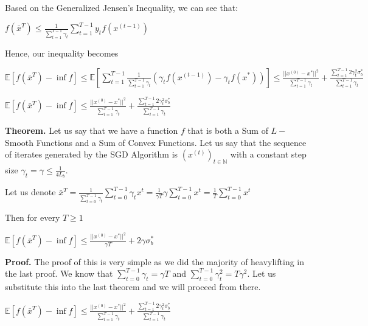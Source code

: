 Based on the Generalized Jensen's Inequality, we can see that: \newline 

$f(\bar{x}^T) \leq \frac{1}{\sum_{t = 1}^{T - 1} \gamma_t} \sum_{t=1}^{T - 1} y_t f(x^{(t - 1)})$

Hence, our inequality becomes \newline 

$\mathbb{E} [f(\bar{x}^T) - \inf f] \leq \mathbb{E} [\sum_{t=1}^{T - 1} \frac{1}{\sum_{t = 1}^{T - 1} \gamma_t}  (\gamma_t f(x^{(t - 1)}) - \gamma_t f(x^*))] \leq \frac{||x^{(0)} - x^*||^2}{\sum_{t = 1}^{T - 1} \gamma_t} + \frac{\sum_{t=1}^{T - 1} 2 \gamma_t^2 \sigma_b^*}{\sum_{t = 1}^{T - 1} \gamma_t}$ \newline 

$\mathbb{E} [f(\bar{x}^T) - \inf f] \leq \frac{||x^{(0)} - x^*||^2}{\sum_{t = 1}^{T - 1} \gamma_t} + \frac{\sum_{t=1}^{T - 1} 2 \gamma_t^2 \sigma_b^*}{\sum_{t = 1}^{T - 1} \gamma_t}$ \newline 

\noindent \textbf{Theorem.} Let us say that we have a function $f$ that is both a Sum of $L-$Smooth Functions and a Sum of Convex Functions. Let us say that the sequence of iterates generated by the SGD Algorithm is $(x^{(t)})_{t \in \mathbb{N}}$ with a constant step size $\gamma_t = \gamma \leq \frac{1}{4L_{b}}$.

Let us denote $\bar{x}^T = \frac{1}{\sum_{t = 0}^{T - 1} \gamma_t} \sum_{t = 0}^{T - 1} \gamma_t x^t = \frac{1}{\gamma T} \gamma \sum_{t = 0}^{T - 1} x^t = \frac{1}{T} \sum_{t = 0}^{T - 1} x^t$ \newline 

Then for every $T \geq 1$ \newline 

$\mathbb{E}[f(\bar{x}^T) - \inf f] \leq \frac{||x^{(0)} - x^*||^2}{\gamma T} + 2\gamma \sigma_b^* $ \newline 

\noindent \textbf{Proof.} The proof of this is very simple as we did the majority of heavylifting in the last proof. We know that $\sum_{t = 0}^{T - 1} \gamma_t = \gamma T$ and $\sum_{t = 0}^{T - 1} \gamma_t^2 = T\gamma^2$. Let us substitute this into the last theorem and we will proceed from there. 

$\mathbb{E} [f(\bar{x}^T) - \inf f] \leq \frac{||x^{(0)} - x^*||^2}{\sum_{t = 1}^{T - 1} \gamma_t} + \frac{\sum_{t=1}^{T - 1} 2 \gamma_t^2 \sigma_b^*}{\sum_{t = 1}^{T - 1} \gamma_t}$ \newline

